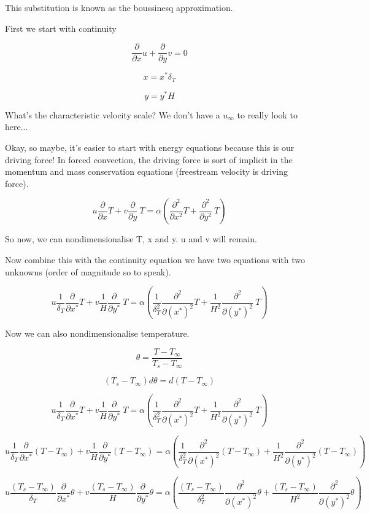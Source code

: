 \documentclass[11pt]{article}
\begin{document}
This substitution is known as the boussinesq approximation.

First we start with continuity

$$  \frac{\partial}{\partial x} u +  \frac{\partial}{\partial y} v  = 0$$

$$ x = x^* \delta_T$$

$$y=y^* H$$

What's the characteristic velocity scale? We don't have a $u_\infty$ to really look to here...

Okay, so maybe, it's easier to start with energy equations because this is our driving force! In forced convection, the driving force is sort of implicit in the momentum and mass conservation equations (freestream velocity is driving force). 

$$ u \frac{\partial}{\partial x} T + v \frac{\partial }{\partial y} \ T  = \alpha ( \frac{\partial^2}{\partial x^2} T +  \frac{\partial^2 }{\partial y^2} \ T) $$ 

So now, we can nondimensionalise T, x and y. u and v will remain. 

Now combine this with the continuity equation we have two equations with two unknowns (order of magnitude so to speak).

$$ u \frac{1}{\delta_T} \frac{\partial}{\partial x^*} T + v \frac{1}{H} \frac{\partial }{\partial y^*} \ T  = \alpha ( \frac{1}{\delta_T^2} \frac{\partial^2}{\partial (x^*)^2} T + \frac{1}{H^2} \frac{\partial^2 }{\partial (y^*)^2} \ T) $$ 

Now we can also nondimensionalise temperature.

$$\theta= \frac{T-T_\infty}{T_s - T_\infty}$$

$$(T_s - T_\infty) d \theta = d (T - T_\infty)$$

$$ u \frac{1}{\delta_T} \frac{\partial}{\partial x^*} T + v \frac{1}{H} \frac{\partial }{\partial y^*} \ T  = \alpha ( \frac{1}{\delta_T^2} \frac{\partial^2}{\partial (x^*)^2} T + \frac{1}{H^2} \frac{\partial^2 }{\partial (y^*)^2} \ T) $$ 


$$ u \frac{1}{\delta_T} \frac{\partial}{\partial x^*} (T - T_\infty) + v \frac{1}{H} \frac{\partial }{\partial y^*}  (T - T_\infty)  = \alpha ( \frac{1}{\delta_T^2} \frac{\partial^2}{\partial (x^*)^2} (T - T_\infty) + \frac{1}{H^2} \frac{\partial^2 }{\partial (y^*)^2} (T - T_\infty)) $$ 

$$ u \frac{(T_s - T_\infty)}{\delta_T} \frac{\partial}{\partial x^*}\theta + v \frac{(T_s - T_\infty)}{H} \frac{\partial }{\partial y^*}  \theta  = \alpha ( \frac{(T_s - T_\infty)}{\delta_T^2} \frac{\partial^2}{\partial (x^*)^2} \theta + \frac{(T_s - T_\infty)}{H^2} \frac{\partial^2 }{\partial (y^*)^2} \theta) $$ 
\end{document}
